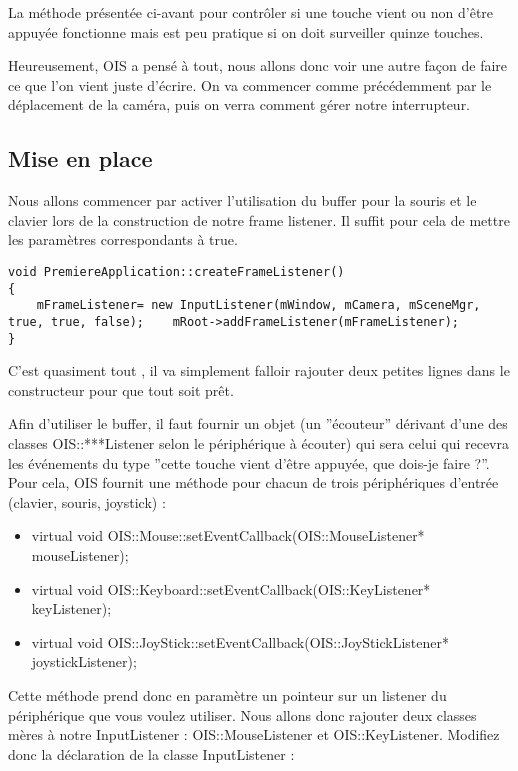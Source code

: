 La méthode présentée ci-avant pour contrôler si une touche vient ou non d'être appuyée fonctionne mais est peu pratique si on doit surveiller quinze touches.

Heureusement, OIS a pensé à tout, nous allons donc voir une autre façon de faire ce que l'on vient juste d'écrire. On va commencer comme précédemment par le déplacement de la caméra, puis on verra comment gérer notre interrupteur.


\subsection{Mise en place}


Nous allons commencer par activer l'utilisation du buffer pour la souris et le clavier lors de la construction de notre frame listener. Il suffit pour cela de mettre les paramètres correspondants à true.


\begin{lstlisting}[caption={Activation du buffer pour la souris et le clavier}]
void PremiereApplication::createFrameListener()
{
    mFrameListener= new InputListener(mWindow, mCamera, mSceneMgr, true, true, false);    mRoot->addFrameListener(mFrameListener);
}
\end{lstlisting}


C'est quasiment tout , il va simplement falloir rajouter deux petites lignes dans le constructeur pour que tout soit prêt.

Afin d'utiliser le buffer, il faut fournir un objet (un ''écouteur'' dérivant d'une des classes OIS::***Listener selon le périphérique à écouter) qui sera celui qui recevra les événements du type ''cette touche vient d'être appuyée, que dois-je faire ?''. Pour cela, OIS fournit une méthode pour chacun de trois périphériques d'entrée (clavier, souris, joystick) :


\begin{itemize}
\item virtual void OIS::Mouse::setEventCallback(OIS::MouseListener* mouseListener);
\item  virtual void OIS::Keyboard::setEventCallback(OIS::KeyListener* keyListener);
\item  virtual void OIS::JoyStick::setEventCallback(OIS::JoyStickListener* joystickListener);
\end{itemize}

Cette méthode prend donc en paramètre un pointeur sur un listener du périphérique que vous voulez utiliser. Nous allons donc rajouter deux classes mères à notre InputListener : OIS::MouseListener et OIS::KeyListener. Modifiez donc la déclaration de la classe InputListener :

